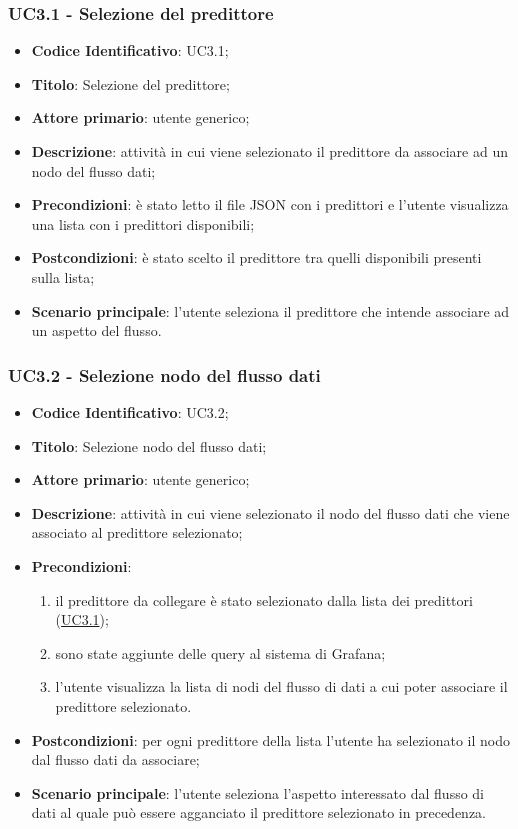 		\label{par:UC3.1}
		\subsubsection{UC3.1 - Selezione del predittore}
		\begin{itemize}
			\item\textbf{Codice Identificativo}: UC3.1;
			\item\textbf{Titolo}: Selezione del predittore;
			\item\textbf{Attore primario}: utente generico;
			\item\textbf{Descrizione}: attività in cui viene selezionato il predittore da associare ad un nodo del flusso dati;
			\item\textbf{Precondizioni}: è stato letto il file JSON con i predittori e l'utente visualizza una lista con i predittori disponibili;
			\item\textbf{Postcondizioni}: è stato scelto il predittore tra quelli disponibili presenti sulla lista;
			\item\textbf{Scenario principale}: l'utente seleziona il predittore che intende associare ad un aspetto del flusso.
		\end{itemize}
		
	
	\label{par:UC3.2}
	\subsubsection{UC3.2 - Selezione nodo del flusso dati}
		\begin{itemize}
			\item\textbf{Codice Identificativo}: UC3.2;
			\item\textbf{Titolo}: Selezione nodo del flusso dati;
			\item\textbf{Attore primario}: utente generico;
			\item\textbf{Descrizione}: attività in cui viene selezionato il nodo del flusso dati che viene associato al predittore selezionato;
			\item\textbf{Precondizioni}:
				\begin{enumerate}
					\item il predittore da collegare è stato selezionato dalla lista dei predittori (\hyperref[par:UC3.1]{UC3.1});
					\item sono state aggiunte delle query al sistema di Grafana;
					\item l'utente visualizza la lista di nodi del flusso di dati a cui poter associare il predittore selezionato.
				\end{enumerate}
			\item\textbf{Postcondizioni}: per ogni predittore della lista l'utente ha selezionato il nodo dal flusso dati da associare;
		
			\item\textbf{Scenario principale}: l'utente seleziona l'aspetto interessato dal flusso di dati al quale può essere agganciato il predittore selezionato in precedenza.
		\end{itemize}
		

